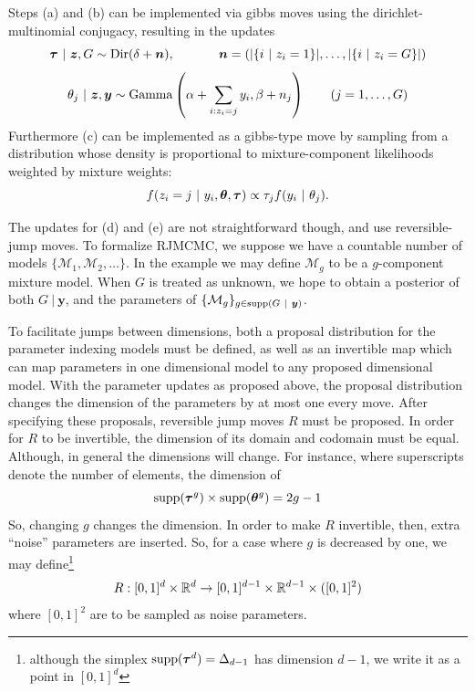 \documentclass[twoside,12pt,bibstyle=chem-acs]{reedthesis}
\begin{document}
Steps (a) and (b) can be implemented via gibbs moves using the dirichlet-multinomial conjugacy, resulting in the updates
\begin{equation*}
\bm\mix ~|~ \bm{z}, G \sim \dir(\delta + \bm{n}), \hspace{0.1\linewidth} \bm{n} = (|\{i ~|~ z_i = 1\}|, \dots, |\{i ~|~ z_i = G\}|) 
\end{equation*}
\begin{equation*}
\theta_j ~|~ \bm{z}, \bm{y} \sim \mathrm{Gamma}\left(\alpha + \sum_{i : z_i = j}y_i, \beta + n_j\right) \tag{$j = 1, \dots, G$}
\end{equation*}
Furthermore (c) can be implemented as a gibbs-type move by sampling from a distribution whose density is proportional to mixture-component likelihoods weighted by mixture weights:
\begin{equation*}
f(z_i = j ~|~ y_i, \bm\theta, \bm{\tau}) \propto \tau_j f(y_i ~|~ \theta_j).
\end{equation*}

The updates for (d) and (e) are not straightforward though, and use reversible-jump moves. To formalize RJMCMC, we suppose we have a countable number of models $\{\mathcal{M}_1, \mathcal{M}_2, \dots \}$. In the example we may define $\mathcal{M}_g$ to be a $g$-component mixture model. When $G$ is treated as unknown, we hope to obtain a posterior of both $G ~|~ \bm{y}$, and the parameters of $\{\mathcal{M}_g\}_{g \in \mathrm{supp}(G ~|~ \bm{y})}$.

To facilitate jumps between dimensions, both a proposal distribution for the parameter indexing models must be defined, as well as an invertible map which can map parameters in one dimensional model to any proposed dimensional model. With the parameter updates as proposed above, the proposal distribution changes the dimension of the parameters by at most one every move. After specifying these proposals, reversible jump moves $R$ must be proposed. In order for $R$ to be invertible, the dimension of its domain and codomain must be equal. Although, in general the dimensions will change. For instance, where superscripts denote the number of elements, the dimension of 
\begin{equation*}
\mathrm{supp}(\bm{\tau}^g) \times \mathrm{supp}(\bm\theta^g) = 2g-1
\end{equation*}
So, changing $g$ changes the dimension. In order to make $R$ invertible, then, extra ``noise'' parameters are inserted. So, for a case where $g$ is decreased by one, we may define\footnote{although the simplex $\mathrm{supp}(\bm\tau^d) = \Delta_{d-1}$ has dimension $d-1$, we write it as a point in $[0,1]^d$}
\begin{equation*}
R: [0,1]^{d} \times \mathbb{R}^d \to [0,1]^{d-1} \times \mathbb{R}^{d-1} \times ([0,1]^2)
\end{equation*}
where $[0,1]^2$ are to be sampled as noise parameters.
\end{document}
